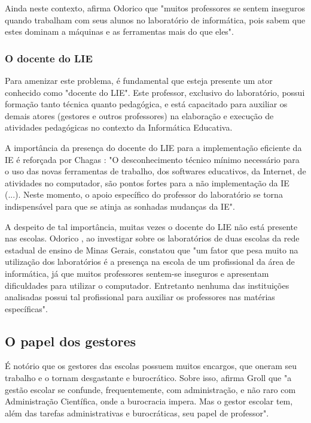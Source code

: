 Ainda neste contexto, afirma Odorico \cite{art:REF_ART_ODORICO} que "muitos professores se sentem inseguros quando trabalham com seus alunos no laboratório de informática, pois sabem que estes dominam a máquinas e as ferramentas mais do que eles".

\subsubsection{O docente do LIE}\label{sec:LABEL_CHP_REF_TEO_SEC_DOC_LIE}

Para amenizar este problema, é fundamental que esteja presente um ator conhecido como "docente do LIE". Este professor, exclusivo do laboratório, possui formação tanto técnica quanto pedagógica, e está capacitado para auxiliar os demais atores (gestores e outros professores) na elaboração e execução de atividades pedagógicas no contexto da Informática Educativa.

A importância da presença do docente do LIE para a implementação eficiente da IE é reforçada por Chagas \cite{art:REF_ART_CHAGAS}: "O desconhecimento técnico mínimo necessário para o uso das novas ferramentas de trabalho, dos softwares educativos, da Internet, de atividades no computador, são pontos fortes para a não implementação da IE (...). Neste momento, o apoio específico do professor do laboratório se torna indispensável para que se atinja as sonhadas mudanças da IE".

A despeito de tal importância, muitas vezes o docente do LIE não está presente nas escolas. Odorico \cite{art:REF_ART_ODORICO}, ao investigar sobre os laboratórios de duas escolas da rede estadual de ensino de Minas Gerais, constatou que "um fator que pesa muito na utilização dos laboratórios é a presença na escola de um profissional da área de informática, já que muitos professores sentem-se inseguros e apresentam dificuldades para utilizar o computador. Entretanto nenhuma das instituições analisadas possui tal profissional para auxiliar os professores nas matérias específicas".

\subsection{O papel dos gestores}\label{sec:LABEL_CHP_REF_TEO_SEC_RES_GEST}

É notório que os gestores das escolas possuem muitos encargos, que oneram seu trabalho e o tornam desgastante e burocrático. Sobre isso, afirma Groll \cite{art:REF_TCC_GROLL} que "a gestão escolar se confunde, frequentemente, com administração, e não raro com Administração Científica, onde a burocracia impera. Mas o gestor escolar tem, além das tarefas administrativas e burocráticas, seu papel de professor".

